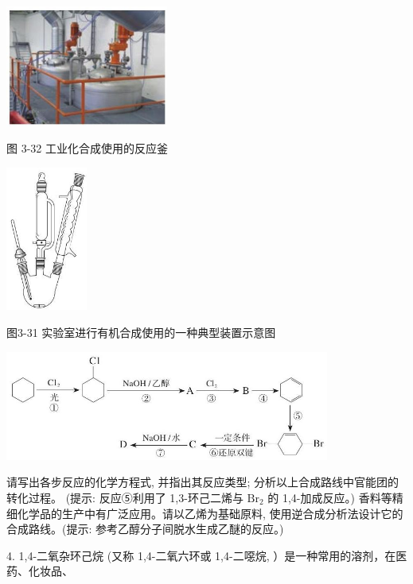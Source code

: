 \documentclass[10pt]{article}
\begin{document}
\begin{center}
\includegraphics[max width=0.4\textwidth]{images/0190efc5-b58a-7c43-bfb0-e0a030df9cfd_96_327493.jpg}
\end{center}

图 3-32 工业化合成使用的反应釜

\begin{center}
\includegraphics[max width=0.2\textwidth]{images/0190efc5-b58a-7c43-bfb0-e0a030df9cfd_96_882099.jpg}
\end{center}

图3-31 实验室进行有机合成使用的一种典型装置示意图

\begin{center}
\includegraphics[max width=0.8\textwidth]{images/0190efc5-b58a-7c43-bfb0-e0a030df9cfd_97_924586.jpg}
\end{center}

请写出各步反应的化学方程式, 并指出其反应类型; 分析以上合成路线中官能团的转化过程。 (提示: 反应⑤利用了 1,3-环己二烯与 \({\mathrm{{Br}}}_{2}\) 的 1,4-加成反应。) 香料等精细化学品的生产中有广泛应用。请以乙烯为基础原料, 使用逆合成分析法设计它的合成路线。(提示: 参考乙醇分子间脱水生成乙醚的反应。)

4. 1,4-二氧杂环己烷 (又称 1,4-二氧六环或 1,4-二噁烷, ）是一种常用的溶剂，在医药、化妆品、
\end{document}
